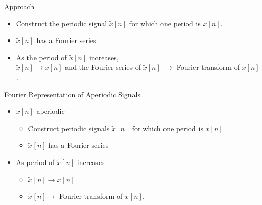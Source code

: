 \begin{frame}{Approach}
    \begin{itemize}
        \item Construct the periodic signal $\tilde{x}[n]$ for which one period is $x[n]$.
        \item $\tilde{x}[n]$ has a Fourier series.
        \item As the period of $\tilde{x}[n]$ increases,\\
            $\tilde{x}[n] \rightarrow x[n]$ and the Fourier series of $\tilde{x}[n]$ $\rightarrow$ Fourier transform of $x[n]$.
    \end{itemize}
\end{frame}



\begin{frame}
    \begin{figure}
        \centering
        
    \end{figure}
\end{frame}


\begin{frame}{Fourier Representation of Aperiodic Signals}
\begin{itemize}
    \item $x[n]$ aperiodic
        \begin{itemize}
          \item Construct periodic signals $\tilde{x}[n]$ for which one period is $x[n]$
          \item $\tilde{x}[n]$ has a Fourier series
        \end{itemize}
    \item As period of $\tilde{x}[n]$ increases
        \begin{itemize}
          \item $\tilde{x}[n] \longrightarrow x[n]$
          \item $\tilde{x}[n] \longrightarrow$ Fourier transform of $x[n]$.
        \end{itemize}
\end{itemize}
\end{frame}



